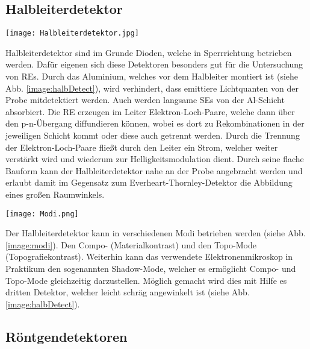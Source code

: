 \subsection*{Halbleiterdetektor}
\label{sub:halbDetect}
\begin{center}
    \texttt{[image: Halbleiterdetektor.jpg]}
    \label{image:halbDetect}
\end{center}
Halbleiterdetektor sind im Grunde Dioden, welche in Sperrrichtung betrieben werden. Dafür eigenen sich diese Detektoren besonders gut für die Untersuchung von REs. Durch das Aluminium, welches vor dem Halbleiter montiert ist (siehe Abb. \ref{image:halbDetect}), wird verhindert, dass emittiere Lichtquanten von der Probe mitdetektiert werden. Auch werden langsame SEs von der Al-Schicht absorbiert. Die RE erzeugen im Leiter Elektron-Loch-Paare, welche dann über den p-n-Übergang diffundieren können, wobei es dort zu Rekombinationen in der jeweiligen Schicht kommt oder diese auch getrennt werden. Durch die Trennung der Elektron-Loch-Paare fließt durch den Leiter ein Strom, welcher weiter verstärkt wird und wiederum zur Helligkeitsmodulation dient. Durch seine flache Bauform kann der Halbleiterdetektor nahe an der Probe angebracht werden und erlaubt damit im Gegensatz zum Everheart-Thornley-Detektor die Abbildung eines großen Raumwinkels.
\begin{center}
    \texttt{[image: Modi.png]}
    \label{image:modi}
\end{center}
Der Halbleiterdetektor kann in verschiedenen Modi betrieben werden (siehe Abb. \ref{image:modi}). Den Compo- (Materialkontrast) und den Topo-Mode (Topografiekontrast).
Weiterhin kann das verwendete Elektronenmikroskop in Praktikum den sogenannten Shadow-Mode, welcher es ermöglicht Compo- und Topo-Mode gleichzeitig darzustellen. Möglich gemacht wird dies mit Hilfe es dritten Detektor, welcher leicht schräg angewinkelt ist (siehe Abb. \ref{image:halbDetect}).
\subsection*{Röntgendetektoren}
